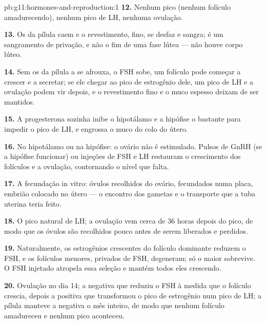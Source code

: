 \begin{solution}{pb:g11:hormones-and-reproduction:1}
\textbf{12.} Nenhum pico (nenhum folículo amadurecendo), nenhum pico de
LH, nenhuma ovulação.

\textbf{13.} Os  da pílula caem e o revestimento, fino, se
desfaz e sangra; é um sangramento de privação, e não o fim de uma fase
lútea --- não houve corpo lúteo.

\textbf{14.} Sem os  da pílula a  se afrouxa,
o FSH sobe, um folículo pode começar a crescer e a secretar; se ele
chegar ao pico de estrogênio dele, um pico de LH e a ovulação podem vir
depois, e o revestimento fino e o muco espesso deixam de ser mantidos.

\textbf{15.} A progesterona sozinha inibe o hipotálamo e a hipófise o
bastante para impedir o pico de LH, e engrossa o muco do colo do útero.

\textbf{16.} No hipotálamo ou na hipófise: o ovário não é estimulado.
Pulsos de GnRH (se a hipófise funcionar) ou injeções de FSH e LH
restauram o crescimento dos folículos e a ovulação, contornando o nível
que falta.

\textbf{17.} A fecundação in vitro: óvulos recolhidos do ovário,
fecundados numa placa, embrião colocado no útero --- o encontro dos
gametas e o transporte que a tuba uterina teria feito.

\textbf{18.} O pico natural de LH; a ovulação vem cerca de 36 horas
depois do pico, de modo que os óvulos são recolhidos pouco antes de
serem liberados e perdidos.

\textbf{19.} Naturalmente, os estrogênios crescentes do folículo
dominante reduzem o FSH, e os folículos menores, privados de FSH,
degeneram; só o maior sobrevive. O FSH injetado atropela essa seleção e
mantém todos eles crescendo.

\textbf{20.} Ovulação no dia 14; a  negativa que
reduziu o FSH à medida que o folículo crescia, depois a
 positiva que transformou o pico de estrogênio num pico
de LH; a pílula manteve a  negativa o mês inteiro, de
modo que nenhum folículo amadureceu e nenhum pico aconteceu.
\end{solution}
